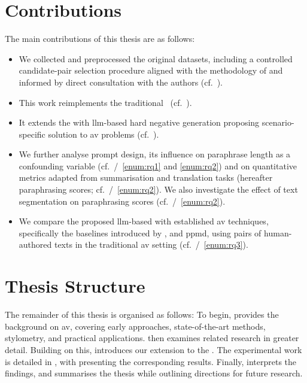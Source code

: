 \section{Contributions}
\label{sec:contributions}
The main contributions of this thesis are as follows:
\begin{itemize}
    \item We collected and preprocessed the original datasets, including a controlled candidate-pair selection procedure aligned with the methodology of \citet{koppel_determining_2014} and informed by direct consultation with the authors (cf.~).
    \item This work reimplements the traditional \impAppr{} \citep{koppel_determining_2014}\ (cf.~).
    \item It extends the \impAppr{} with \ac{llm}-based hard negative generation proposing scenario-specific solution to \ac{av} problems (cf.~). 
    \item We further analyse prompt design, its influence on paraphrase length as a confounding variable (cf.~/~\ref{enum:rq1} and \ref{enum:rq2}) and on quantitative metrics adapted from summarisation and translation tasks (hereafter paraphrasing scores; cf.~/~\ref{enum:rq2}).
    We also investigate the effect of text segmentation on paraphrasing scores (cf.~/~\ref{enum:rq2}).
    \item We compare the proposed \ac{llm}-based \impAppr{} with established \ac{av} techniques, specifically the baselines introduced by \citet{koppel_determining_2014}, \unmasking{} and \acs{ppmd}, 
    using pairs of human-authored texts in the traditional \ac{av} setting (cf.~/~\ref{enum:rq3}).
   
\end{itemize}



\section{Thesis Structure}
\label{sec:thesis_structure}

The remainder of this thesis is organised as follows: 
To begin,  provides the background on \ac{av}, covering early approaches, state-of-the-art methods, stylometry, and practical applications.
 then examines related research in greater detail.
Building on this,  introduces our extension to the \impAppr{}.
The experimental work is detailed in , with  presenting the corresponding results.
Finally,  interprets the findings, and  summarises the thesis while outlining directions for future research.
